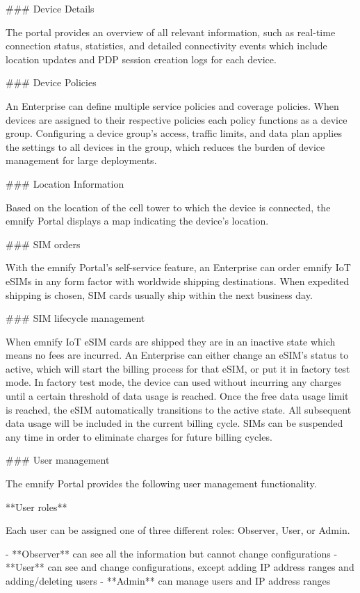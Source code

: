 \documentclass[11pt, oneside]{article}   	%
\newcommand{\addspace}{\vspace{2mm}}
\begin{document}
\begin{markdown}

### Device Details

The portal provides an overview of all relevant information, such as real-time connection status, statistics, and detailed connectivity events which include location updates and PDP session creation logs for each device.

### Device Policies

An Enterprise can define multiple service policies and coverage policies.
When devices are assigned to their respective policies each policy functions as a device group.
Configuring a device group's access, traffic limits, and data plan applies the settings to all devices in the group, which reduces the burden of device management for large deployments.

### Location Information

Based on the location of the cell tower to which the device is connected, the emnify Portal displays a map indicating the device's location.

### SIM orders

With the emnify Portal's self-service feature, an Enterprise can order emnify IoT eSIMs in any form factor with worldwide shipping destinations.
When expedited shipping is chosen, SIM cards usually ship within the next business day. 

### SIM lifecycle management

When emnify IoT eSIM cards are shipped they are in an inactive state which means no fees are incurred.
An Enterprise can either change an eSIM's status to active, which will start the billing process for that eSIM, or put it in factory test mode.
In factory test mode, the device can used without incurring any charges until a certain threshold of data usage is reached.
Once the free data usage limit is reached, the eSIM automatically transitions to the active state.
All subsequent data usage will be included in the current billing cycle. 
SIMs can be suspended any time in order to eliminate charges for future billing cycles. 

### User management

The emnify Portal provides the following user management functionality. 

**User roles**

Each user can be assigned one of three different roles: Observer, User, or Admin. 
\end{markdown}
\addspace
\begin{markdown}
- **Observer** can see all the information but cannot  change configurations
- **User** can see and change configurations, except adding IP address ranges and adding/deleting users 
- **Admin** can manage users and IP address ranges
\end{markdown}
\end{document}
